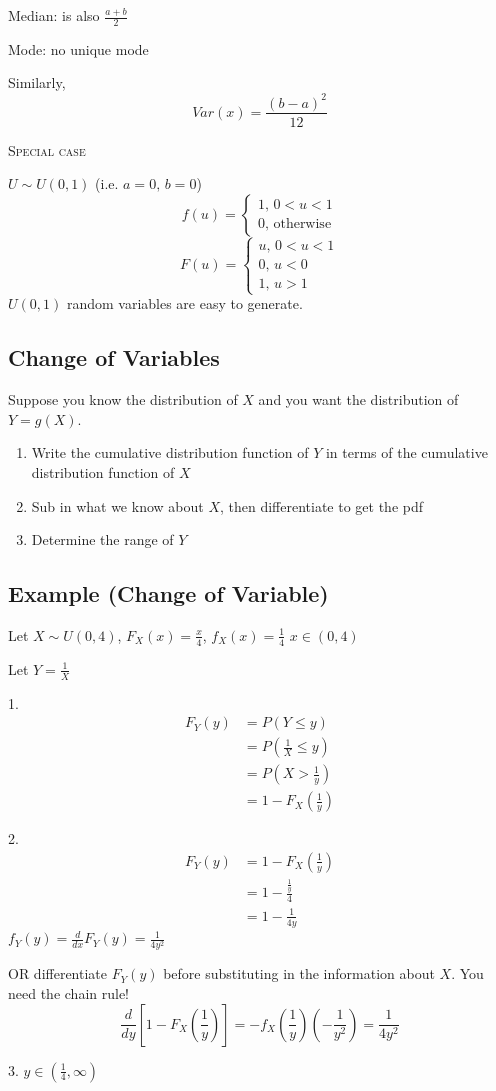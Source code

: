 Median: is also $ \frac{a+b}{2} $

Mode: no unique mode

Similarly,
\[ Var(x)=\frac{(b-a)^2}{12} \]

\textsc{Special case}

$ U \sim U(0,1) $ (i.e. $ a=0,\,b=0 $)
\[ f(u)=
    \begin{cases}
        1,\,0<u<1 \\
        0,\,\text{otherwise}
    \end{cases} \]
\[ F(u)=
    \begin{cases}
        u,\,0<u<1 \\
        0,\,u<0   \\
        1,\,u>1
    \end{cases} \]
$ U(0,1) $ random variables are easy to generate.

\subsection{Change of Variables}
Suppose you know the distribution of $ X $ and you want the distribution of
$ Y=g(X) $.
\begin{enumerate}
    \item Write the cumulative distribution function of $ Y $ in terms of the cumulative distribution function of $ X $
    \item Sub in what we know about $ X $, then differentiate to get the pdf
    \item Determine the range of $ Y $
\end{enumerate}
\subsection{Example (Change of Variable)}
Let $ X \sim U(0,4) $, $ F_X(x)=\frac{x}{4} $, $ f_X(x)=\frac{1}{4} $
$ x\in(0,4) $

Let $ Y=\frac{1}{X} $

1.
\begin{align*}
    F_Y(y) & =P\left(Y\le y\right)            \\
           & =P\left(\frac{1}{X} \le y\right) \\
           & =P\left(X>\frac{1}{y}\right)     \\
           & =1-F_X\left(\frac{1}{y}\right)
\end{align*}

2.
\begin{align*}
    F_Y(y) & =1-F_X\left(\frac{1}{y}\right) \\
           & =1-\frac{\frac{1}{y}}{4}       \\
           & =1-\frac{1}{4y}
\end{align*}
$ f_Y(y)=\frac{d}{dx}F_Y(y)=\frac{1}{4y^2} $

OR differentiate $ F_Y(y) $ before
substituting in the information about $ X $. You need the chain rule!
\[ \frac{d}{dy}\left[1-F_X\left(\frac{1}{y}\right)\right]=
    -f_X\left(\frac{1}{y}\right)\left(-\frac{1}{y^2}\right)=\frac{1}{4y^2} \]

3. $ y\in(\frac{1}{4},\infty) $
